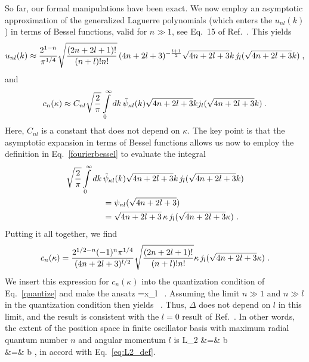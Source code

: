 	So far, our formal manipulations have been exact.  We now employ an
	asymptotic approximation of the generalized Laguerre polynomials
	(which enters the $u_{nl}(k)$) in terms of Bessel functions, valid for
	$n\gg 1$, see Eq.~15 of Ref.~\cite{Deano2013}.  This yields
	\begin{align}
	u_{nl}(k) \approx {2^{1-n}\over \pi^{1/4}} \sqrt{(2n+2l+1)!\over (n+l)! n!}
	   \,(4n+2l+3)^{-{l+1\over 2}}
	   \sqrt{4n+2l+3} k\, j_l(\sqrt{4n+2l+3}k) \;,
	\end{align}
	and
	\begin{align}
	c_n(\kappa) \approx C_{nl} \sqrt{2\over \pi}\int\limits_0^\infty dk \,
	\tilde{\psi}_{\kappa l}(k)	\sqrt{4n+2l+3} k
	 j_l(\sqrt{4n+2l+3}k) \;.
	\end{align}
	Here, $C_{nl}$ is a constant that does not depend on $\kappa$.  The key
	point is that the asymptotic expansion in terms of Bessel functions
	allows us now to employ the definition in Eq.~\eqref{fourierbessel} to
	evaluate the integral
	\begin{align}
	 \sqrt{2\over \pi}\int\limits_0^\infty dk\, & \tilde{\psi}_{\kappa l}(k)
	\sqrt{4n+2l+3} k\, j_l(\sqrt{4n+2l+3}k) \nonumber \\
	&=  \psi_{\kappa l}(\sqrt{4n+2l+3}) \nonumber \\
	&= \sqrt{4n+2l+3}\, \kappa\, j_l(\sqrt{4n+2l+3}\kappa) \;.
	\end{align}
	Putting it all together, we find
	\begin{align}
	c_n(\kappa) = {2^{1/2-n}(-1)^n \pi^{1/4} \over (4n+2l+3)^{l/2}}
	\sqrt{(2n+2l+1)!\over (n+l)!n!}
	\kappa\, j_l(\sqrt{4n+2l+3}\kappa) \;.
	\end{align}
	We insert this expression for $c_n(\kappa)$ into the quantization
	condition of Eq.~\eqref{quantize} and make the ansatz
	\beq
	\kappa ={x_l\over{}} \ .
	\eeq
	Assuming the limit $n\gg 1$ and $n\gg l$ in the quantization condition
	then yields
	\beq
	 \ .
	\eeq
	Thus, $\Delta$ does not depend on $l$ in this limit, and the result
	is consistent with the $l=0$ result of Ref.~\cite{More:2013rma}. In
	other words, the extent of the position space in finite oscillator
	basis with maximum radial quantum number $n$ and angular momentum $l$ is
	\bea
	\label{L2}
	  L_2 &=& b \nonumber\\
	&=& b \;,
	\eea
	in accord with Eq.~\eqref{eq:L2_def}.


